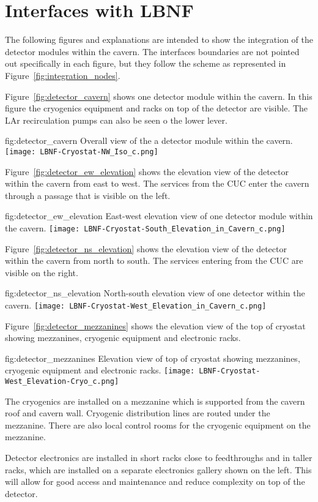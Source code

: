 \section{Interfaces with LBNF}
\label{sec:inter-lbnf-interf}
The following figures and explanations are intended to show the
integration of the detector modules within the cavern. The interfaces
boundaries are not pointed out specifically in each figure, but they
follow the scheme as represented in
Figure~\ref{fig:integration_nodes}.

Figure~\ref{fig:detector_cavern} shows one detector module within the
cavern. In this figure the cryogenics equipment and racks on top of
the detector are visible. The LAr recirculation pumps can also be seen
o the lower lever.
\begin{dunefigure}{fig:detector_cavern}
  {Overall view of the a detector module within the cavern.}
  \texttt{[image: LBNF-Cryostat-NW\_Iso\_c.png]}
\end{dunefigure}

Figure~\ref{fig:detector_ew_elevation} shows the elevation view of the
detector within the cavern from east to west. The services from the
CUC enter the cavern through a passage that is visible on the left.
\begin{dunefigure}{fig:detector_ew_elevation}
  {East-west elevation view of one detector module within the cavern.}
  \texttt{[image: LBNF-Cryostat-South\_Elevation\_in\_Cavern\_c.png]}
\end{dunefigure}

Figure~\ref{fig:detector_ns_elevation} shows the elevation view of the
detector within the cavern from north to south. The services entering
from the CUC are visible on the right.
\begin{dunefigure}{fig:detector_ns_elevation}
  {North-south elevation view of one detector within the cavern.}
  \texttt{[image: LBNF-Cryostat-West\_Elevation\_in\_Cavern\_c.png]}
\end{dunefigure}

Figure~\ref{fig:detector_mezzanines} shows the elevation view of the
top of cryostat showing mezzanines, cryogenic equipment and electronic
racks.
\begin{dunefigure}{fig:detector_mezzanines}
  {Elevation view of top of cryostat showing mezzanines, cryogenic
    equipment and electronic racks.}
  \texttt{[image: LBNF-Cryostat-West\_Elevation-Cryo\_c.png]}
\end{dunefigure}
The cryogenics are installed on a mezzanine which is supported from
the cavern roof and cavern wall. Cryogenic distribution lines are
routed under the mezzanine. There are also local control rooms for the
cryogenic equipment on the mezzanine.

Detector electronics are installed in short racks close to
feedthroughs and in taller racks, which are installed on a separate
electronics gallery shown on the left. This will allow for good access
and maintenance and reduce complexity on top of the detector.


